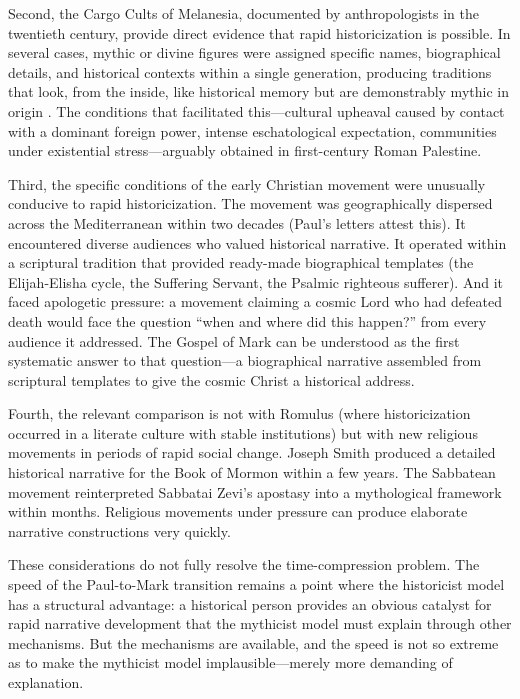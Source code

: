 \documentclass[12pt,oneside]{article}
\begin{document}
Second, the Cargo Cults of Melanesia, documented by anthropologists in
the twentieth century, provide direct evidence that rapid
historicization is possible.  In several cases, mythic or divine figures
were assigned specific names, biographical details, and historical
contexts within a single generation, producing traditions that look,
from the inside, like historical memory but are demonstrably mythic in
origin \citep{Worsley1957,Lindstrom1993}.  The conditions that
facilitated this---cultural upheaval caused by contact with a dominant
foreign power, intense eschatological expectation, communities under
existential stress---arguably obtained in first-century Roman Palestine.

Third, the specific conditions of the early Christian movement were
unusually conducive to rapid historicization.  The movement was
geographically dispersed across the Mediterranean within two decades
(Paul's letters attest this).  It encountered diverse audiences who
valued historical narrative.  It operated within a scriptural
tradition that provided ready-made biographical templates (the
Elijah-Elisha cycle, the Suffering Servant, the Psalmic righteous
sufferer).  And it faced apologetic pressure: a movement claiming a
cosmic Lord who had defeated death would face the question ``when and
where did this happen?'' from every audience it addressed.  The Gospel
of Mark can be understood as the first systematic answer to that
question---a biographical narrative assembled from scriptural templates
to give the cosmic Christ a historical address.

Fourth, the relevant comparison is not with Romulus (where
historicization occurred in a literate culture with stable institutions)
but with new religious movements in periods of rapid social change.
Joseph Smith produced a detailed historical narrative for the Book of
Mormon within a few years.  The Sabbatean movement reinterpreted
Sabbatai Zevi's apostasy into a mythological framework within months.
Religious movements under pressure can produce elaborate narrative
constructions very quickly.

These considerations do not fully resolve the time-compression problem.
The speed of the Paul-to-Mark transition remains a point where the
historicist model has a structural advantage: a historical person
provides an obvious catalyst for rapid narrative development that the
mythicist model must explain through other mechanisms.  But the
mechanisms are available, and the speed is not so extreme as to make
the mythicist model implausible---merely more demanding of explanation.
\end{document}
